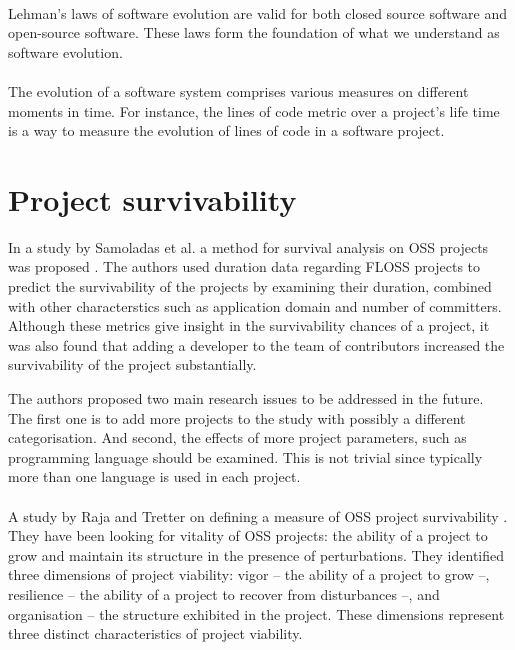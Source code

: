 \paragraph{}
Lehman's laws of software evolution are valid for both closed source software
and open-source software. These laws form the foundation of what we understand
as software evolution.

\paragraph{}
The evolution of a software system comprises various measures on different
moments in time. For instance, the lines of code metric over a project's life
time is a way to measure the evolution of lines of code in a software project.



\section{Project survivability}
In a study by Samoladas et al. a method for survival analysis on OSS projects
was proposed \cite{samoladas2010}. The authors used duration data regarding
FLOSS projects to predict the survivability of the projects by examining their
duration, combined with other characterstics such as application domain and
number of committers. Although these metrics give insight in the survivability
chances of a project, it was also found that adding a developer to the team of
contributors increased the survivability of the project substantially.

The authors proposed two main research issues to be addressed in the future. The
first one is to add more projects to the study with possibly a different
categorisation. And second, the effects of more project parameters, such as
programming language should be examined. This is not trivial since typically
more than one language is used in each project.

\paragraph{}
A study by Raja and Tretter on defining a measure of OSS project survivability
\cite{raja2012}.
They have been looking for vitality of OSS projects: the ability of a project
to grow and maintain its structure in the presence of perturbations. They
identified three dimensions of project viability: vigor -- the ability of a
project to grow --, resilience -- the ability of a project to recover from
disturbances --, and organisation -- the structure exhibited in the project.
These dimensions represent three distinct characteristics of project viability.

